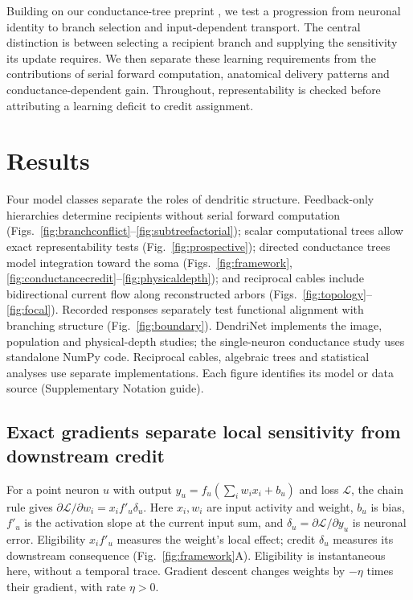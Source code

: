\documentclass[11pt]{article}
\begin{document}
Building on our conductance-tree preprint \citep{safaai2026localcredit}, we test a progression from neuronal identity to branch selection and input-dependent transport. The central distinction is between selecting a recipient branch and supplying the sensitivity its update requires. We then separate these learning requirements from the contributions of serial forward computation, anatomical delivery patterns and conductance-dependent gain. Throughout, representability is checked before attributing a learning deficit to credit assignment.

\section*{Results}

Four model classes separate the roles of dendritic structure. Feedback-only hierarchies determine recipients without serial forward computation (Figs.~\ref{fig:branchconflict}--\ref{fig:subtreefactorial}); scalar computational trees allow exact representability tests (Fig.~\ref{fig:prospective}); directed conductance trees model integration toward the soma (Figs.~\ref{fig:framework}, \ref{fig:conductancecredit}--\ref{fig:physicaldepth}); and reciprocal cables include bidirectional current flow along reconstructed arbors (Figs.~\ref{fig:topology}--\ref{fig:focal}). Recorded responses separately test functional alignment with branching structure (Fig.~\ref{fig:boundary}). DendriNet implements the image, population and physical-depth studies; the single-neuron conductance study uses standalone NumPy code. Reciprocal cables, algebraic trees and statistical analyses use separate implementations. Each figure identifies its model or data source (Supplementary Notation guide).

\subsection*{Exact gradients separate local sensitivity from downstream credit}

For a point neuron $u$ with output $y_u=f_u(\sum_iw_ix_i+b_u)$ and loss $\mathcal L$, the chain rule gives $\partial\mathcal L/\partial w_i=x_if'_u\delta_u$. Here $x_i,w_i$ are input activity and weight, $b_u$ is bias, $f'_u$ is the activation slope at the current input sum, and $\delta_u=\partial\mathcal L/\partial y_u$ is neuronal error. Eligibility $x_if'_u$ measures the weight's local effect; credit $\delta_u$ measures its downstream consequence (Fig.~\ref{fig:framework}A). Eligibility is instantaneous here, without a temporal trace. Gradient descent changes weights by $-\eta$ times their gradient, with rate $\eta>0$.
\end{document}
